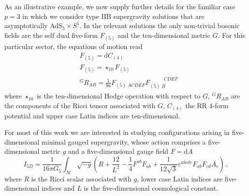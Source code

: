 \documentclass[11pt]{article}
\begin{document}
As an illustrative example, we now supply further details for the familiar case $p=3$ in which we consider type IIB supergravity solutions that are asymptotically AdS$_5 \times S^5$.
In the relevant solutions the only non-trivial bosonic fields are the self dual five-form $F_{(5)}$ and the ten-dimensional metric $G$. 
For this particular sector, the equations of motion read
\begin{subequations}
\begin{align}
&F_{(5)}=\mathrm{d}C_{(4)}
\\
&F_{(5)}=\star_{10} F_{(5)}
\\
& {}^{G}R_{AB}=\frac{1}{96}F_{(5)\;ACDEF}F_{(5)\;B}^{\phantom{(5)B}CDEF}
\end{align}
\end{subequations}%
where $\star_{10}$ is the ten-dimensional Hodge operation with respect to $G$, ${}^{G}R_{AB}$ are the components of the Ricci tensor associated with $G$, $C_{(4)}$ the RR 4-form potential and upper case Latin indices are ten-dimensional.

For most of this work we are interested in studying configurations arising in five-dimensional minimal gauged supergravity, whose action comprises a five-dimensional metric $g$ and a five-dimensional gauge field $F=\mathrm{d}A$
\begin{equation}
I_{5D}=\frac{1}{16 \pi G_5}\int_{\mathcal{M}}\sqrt{-g}\left(R+\frac{12}{L^2}-\frac{1}{4}F^{ab}F_{ab}+\frac{1}{12\sqrt{3}}\varepsilon^{abcde}F_{ab}F_{cd}A_e\right)\,,
\label{eq:1}
\end{equation}
where $R$ is the Ricci scalar associated with $g$, lower case Latin indices are five-dimensional indices and $L$ is the five-dimensional cosmological constant.
\end{document}
